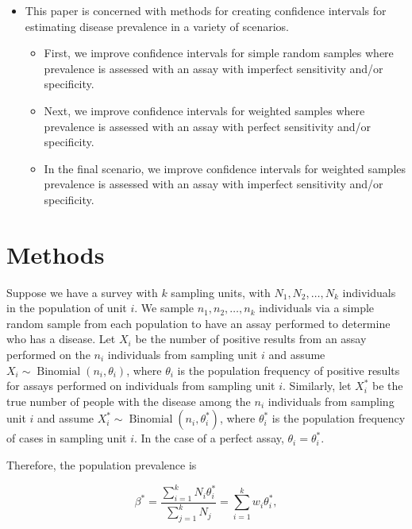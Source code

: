 \documentclass[AMA,STIX1COL]{WileyNJD-v2}
\begin{document}
\begin{itemize}
    \item This paper is concerned with methods for creating confidence intervals for estimating disease prevalence in a variety of scenarios.
    \begin{itemize}
        \item First, we improve confidence intervals for simple random samples where prevalence is assessed with an assay with imperfect sensitivity and/or specificity.
        \item Next, we improve confidence intervals for weighted samples where prevalence is assessed with an assay with perfect sensitivity and/or specificity.
        \item In the final scenario, we improve confidence intervals for weighted samples prevalence is assessed with an assay with imperfect sensitivity and/or specificity.
    \end{itemize}
\end{itemize}

\section{Methods}

Suppose we have a survey with  \( k \) sampling units, with \( N_1, N_2, \ldots, N_k \) individuals in the population of unit \( i \).
We sample \( n_1, n_2, \ldots, n_k \) individuals via a simple random sample from each population to have an assay performed to determine who has a disease.
Let \( X_i \) be the number of positive results from an assay performed on the \( n_i \) individuals from sampling unit \( i \) and assume \( X_i \sim \operatorname{Binomial}(n_i, \theta_i) \), where \( \theta_i \) is the population frequency of positive results for assays performed on individuals from sampling unit \( i \).
Similarly, let \( X_i^* \) be the true number of people with the disease among the \( n_i \) individuals from sampling unit \( i \) and assume \( X_i^* \sim \operatorname{Binomial}(n_i, \theta_i^*) \), where \( \theta_i^* \) is the population frequency of cases in sampling unit \( i \).
In the case of a perfect assay, \( \theta_i = \theta_i^* \).

Therefore, the population prevalence is 

\begin{equation}
    \beta^* = \frac{\sum_{i=1}^k N_i \theta_i^*}{\sum_{j=1}^k N_j} = \sum_{i=1}^k w_i \theta_i^*,
    \label{eq:pop-prev}
\end{equation}
\end{document}

